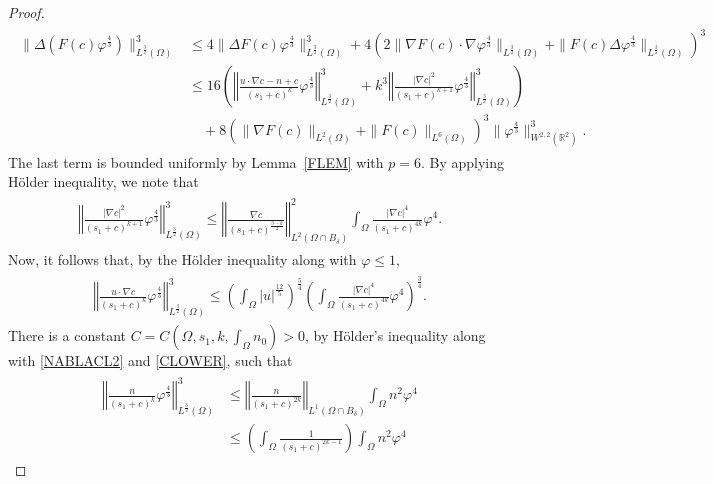 \documentclass[10pt,a4paper]{amsart}
\newcommand{\R}{{ \mathbb{R}  }}
\newcommand{\bke}[1]{\left( #1 \right)}
\newcommand{\norm}[1]{\left\Vert #1 \right\Vert}
\begin{document}
\begin{proof}
\begin{align*}
\begin{aligned}
\|  \Delta(F(c)   \varphi^{\frac{4}{3}})  \|_{L^{\frac{3}{2}}(\Omega)}^{3}
&\le 4\| \Delta F(c)   \varphi^{\frac{4}{3}}   \|_{L^{\frac{3}{2}}(\Omega)}^{3}
    +4 \left( 2\| \nabla F(c) \cdot \nabla \varphi^{\frac{4}{3}}\|_{L^{\frac{3}{2}}(\Omega)}+\| F( c)  \Delta \varphi^{\frac{4}{3}}   \|_{L^{\frac{3}{2}}(\Omega)}\right)^{3}
\\
&\le  16\bke{\norm{\frac{ u\cdot \nabla c-n+c  }{(s_{1}+c)^{k}}  \varphi^{\frac{4}{3}}   }_{L^{\frac{3}{2}}(\Omega)}^{3}
+  k^{3}\norm{ \frac{|\nabla c|^{2}}{(s_{1}+c)^{k+1}}      \varphi^{\frac{4}{3}}   }_{L^{\frac{3}{2}}(\Omega)}^{3}} 
\\&\quad+ 8\left( \|\nabla F(c)  \|_{L^{2}(\Omega )} +\|F(c)\|_{L^{6}(\Omega)} \right)^{3} \|\varphi^{\frac{4}{3}}\|^{3}_{W^{2,2}(\R^{2})}  .
\end{aligned}
\end{align*}
The last term is bounded uniformly by Lemma~\ref{FLEM} with $p=6$.
By applying H\"{o}lder inequality, we note that 
\begin{align*}
\begin{aligned}
\norm{ \frac{|\nabla c|^{2}}{(s_{1}+c)^{k+1}}      \varphi^{\frac{4}{3}}   }_{L^{\frac{3}{2}}(\Omega)}^{3}  \le \norm{\frac{\nabla c}{(s_{1}+c)^{\frac{3-k}{2}}}}_{L^{2}(\Omega\cap B_{\delta})}^{2}  \int_{\Omega} \frac{|\nabla c|^{4}}{(s_{1}+c)^{4k}}\varphi^{4}. 
\end{aligned}
\end{align*}
Now, it follows that, by the H\"{o}lder inequality along with $ \varphi \le 1$, 
\begin{align*}
\begin{aligned}
\norm{\frac{ u\cdot \nabla c  }{(s_{1}+c)^{k}}  \varphi^{\frac{4}{3}}   }_{L^{\frac{3}{2}}(\Omega)}^{3}
\le \bke{\int_{\Omega}|u|^{\frac{12}{5}} }^{\frac{5}{4}}\bke{\int_{\Omega} \frac{|\nabla c|^{4}}{(s_{1}+c)^{4k}}\varphi^{4}}^{\frac{3}{4}}.
\end{aligned}
\end{align*}
There is a constant $C=C(\Omega, s_1, k, \int_{\Omega}n_0)>0$, by H\"older's inequality along with \eqref{NABLACL2} and \eqref{CLOWER}, such that 
\begin{align*}
\begin{aligned}
\norm{ \frac{ n }{(s_{1}+c)^{k}}  \varphi^{\frac{4}{3}}   }_{L^{\frac{3}{2}}(\Omega)}^{3} 
&\le  \norm{\frac{n}{(s_{1}+c)^{2k}}}_{L^{1}( \Omega \cap B_{\delta} )}\int_{\Omega}n^{2}\varphi^{4} 
\\&  \le \left(\int_{\Omega} \frac{1}{(s_{1}+c)^{2k-1}} \right) \int_{\Omega}n^{2}\varphi^{4} 

\end{aligned}
\end{align*}
\end{proof}
\end{document}
